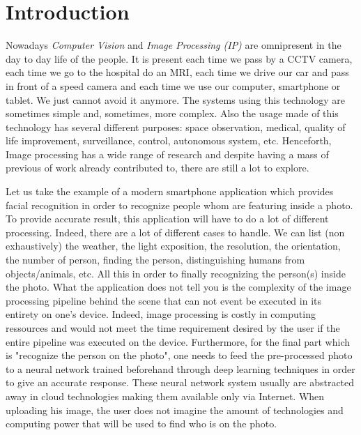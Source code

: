 \chapter*{Introduction}
\label{introduction.chap.introduction}

Nowadays \emph{Computer Vision} and \emph{Image Processing (IP)} are omnipresent in the day to day life of the people.
It is present each time we pass by a CCTV camera, each time we go to the hospital do an MRI, each time we drive our car
and pass in front of a speed camera and each time we use our computer, smartphone or tablet. We just cannot avoid it
anymore. The systems using this technology are sometimes simple and, sometimes, more complex. Also the usage made of
this technology has several different purposes: space observation, medical, quality of life improvement, surveillance,
control, autonomous system, etc. Henceforth, Image processing has a wide range of research and despite having a mass of
previous of work already contributed to, there are still a lot to explore.

Let us take the example of a modern smartphone application which provides facial recognition in order to recognize
people whom are featuring inside a photo. To provide accurate result, this application will have to do a lot of
different processing. Indeed, there are a lot of different cases to handle. We can list (non exhaustively) the weather,
the light exposition, the resolution, the orientation, the number of person, finding the person, distinguishing humans
from objects/animals, etc. All this in order to finally recognizing the person(s) inside the photo. What the application
does not tell you is the complexity of the image processing pipeline behind the scene that can not event be executed in
its entirety on one's device. Indeed, image processing is costly in computing ressources and would not meet the time
requirement desired by the user if the entire pipeline was executed on the device. Furthermore, for the final part which
is "recognize the person on the photo", one needs to feed the pre-processed photo to a neural network trained beforehand
through deep learning techniques in order to give an accurate response. These neural network system usually are
abstracted away in cloud technologies making them available only via Internet. When uploading his image, the user does
not imagine the amount of technologies and computing power that will be used to find who is on the photo.

